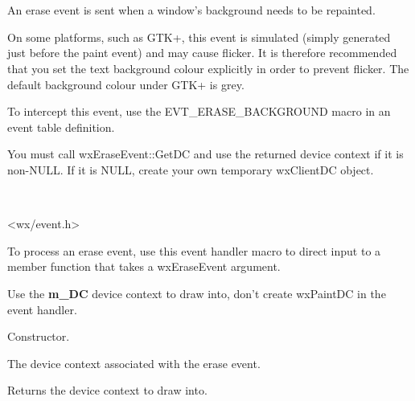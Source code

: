 \section{}\label{wxeraseevent}

An erase event is sent when a window's background needs to be repainted.

On some platforms, such as GTK+, this event is simulated (simply generated just before the
paint event) and may cause flicker. It is therefore recommended that
you set the text background colour explicitly in order to prevent flicker.
The default background colour under GTK+ is grey.

To intercept this event, use the EVT\_ERASE\_BACKGROUND macro in an event table definition.

You must call wxEraseEvent::GetDC and use the returned device context if it is non-NULL.
If it is NULL, create your own temporary wxClientDC object. 


\\


<wx/event.h>


To process an erase event, use this event handler macro to direct input to a member
function that takes a wxEraseEvent argument.

\twocolwidtha{7cm}
\begin{twocollist}\itemsep=0pt
\end{twocollist}%


Use the {\bf m\_DC} device context to draw into, don't create wxPaintDC in 
the event handler.






Constructor.



The device context associated with the erase event.

\label{wxeraseeventgetdc}


Returns the device context to draw into.

